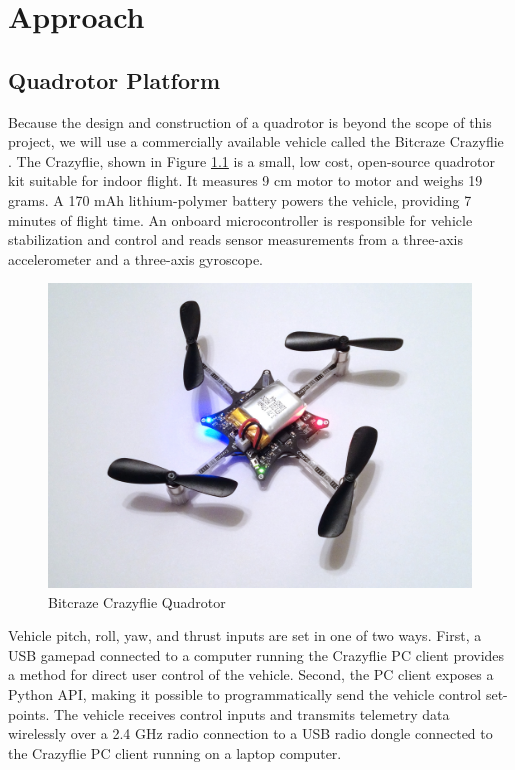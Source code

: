 \chapter{Approach}

\section{Quadrotor Platform}
Because the design and construction of a quadrotor is beyond the scope of  this project, we will use a commercially available vehicle called the Bitcraze Crazyflie \cite{bitcraze}. The Crazyflie, shown in Figure \ref{fig:quad} is a small, low cost, open-source quadrotor kit suitable for indoor flight. It measures 9 cm motor to motor and weighs 19 grams. A 170 mAh lithium-polymer battery powers the vehicle, providing 7 minutes of flight time. An onboard microcontroller is responsible for vehicle stabilization and control and reads sensor measurements from a three-axis accelerometer and a three-axis gyroscope.
\begin{figure}[!htb]
\centering \includegraphics[scale=.11]{../fig/crazyflie.jpg}
\caption{Bitcraze Crazyflie Quadrotor}
\label{fig:quad}
\end{figure}

Vehicle pitch, roll, yaw, and thrust inputs are set in one of two ways. First, a USB gamepad connected to a computer running the Crazyflie PC client provides a method for direct user control of the vehicle. Second, the PC client exposes a Python API, making it possible to programmatically send the vehicle control set-points. The vehicle receives control inputs and transmits telemetry data wirelessly over a 2.4 GHz radio connection to a USB radio dongle connected to the Crazyflie PC client running on a laptop computer.

